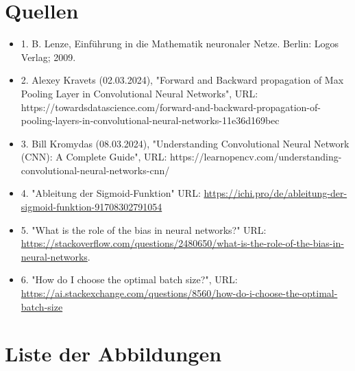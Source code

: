\documentclass[12pt]{article}
\begin{document}
\cleardoublepage
\sloppy
\section{Quellen}
\begin{itemize}
\item 1. B. Lenze, Einführung in die Mathematik neuronaler Netze. Berlin: Logos Verlag; 2009.
\item 2. Alexey Kravets (02.03.2024), "Forward and Backward propagation of Max Pooling Layer in Convolutional Neural Networks", URL: https://towardsdatascience.com/forward-and-backward-propagation-of-pooling-layers-in-convolutional-neural-networks-11e36d169bec
\item 3. Bill Kromydas (08.03.2024), "Understanding Convolutional Neural Network (CNN): A Complete Guide", URL: https://learnopencv.com/understanding-convolutional-neural-networks-cnn/



\item 4. "Ableitung der Sigmoid-Funktion" URL: \url{https://ichi.pro/de/ableitung-der-sigmoid-funktion-91708302791054}
\item 5. "What is the role of the bias in neural networks?" URL: \url{https://stackoverflow.com/questions/2480650/what-is-the-role-of-the-bias-in-neural-networks}.
\item 6. "How do I choose the optimal batch size?", URL: \url{https://ai.stackexchange.com/questions/8560/how-do-i-choose-the-optimal-batch-size}
\end{itemize}

\cleardoublepage
\section{Liste der Abbildungen}
\listoffigures
\end{document}
